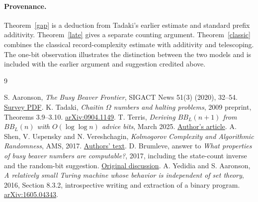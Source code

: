 \documentclass[11pt]{article}
\begin{document}
\paragraph{Provenance.} Theorem~\ref{gap} is a deduction from Tadaki's earlier estimate and standard prefix additivity. Theorem~\ref{late} gives a separate counting argument. Theorem~\ref{classic} combines the classical record-complexity estimate with additivity and telescoping. The one-bit observation illustrates the distinction between the two models and is included with the earlier argument and suggestion credited above.
\begin{thebibliography}{9}\raggedright
{} S. Aaronson, \emph{The Busy Beaver Frontier}, SIGACT News 51(3) (2020), 32--54. \href{https://docs.bbchallenge.org/papers/Aaronson2020.pdf}{Survey PDF}.
 K. Tadaki, \emph{Chaitin $\Omega$ numbers and halting problems}, 2009 preprint, Theorems 3.9--3.10. \href{https://arxiv.org/abs/0904.1149}{arXiv:0904.1149}.
 T. Terris, \emph{Deriving $BB_L(n+1)$ from $BB_L(n)$ with $O(\log\log n)$ advice bits}, March 2025. \href{https://tkterris.github.io/2025/03/13/evolving-busy-beavers.html}{Author's article}.
 A. Shen, V. Uspensky and N. Vereshchagin, \emph{Kolmogorov Complexity and Algorithmic Randomness}, AMS, 2017. \href{https://www.lirmm.fr/~ashen/kolmbook-eng.pdf}{Authors' text}.
 D. Brumleve, answer to \emph{What properties of busy beaver numbers are computable?}, 2017, including the state-count inverse and the random-bit suggestion. \href{https://math.stackexchange.com/questions/271834/what-properties-of-busy-beaver-numbers-are-computable}{Original discussion}.
 A. Yedidia and S. Aaronson, \emph{A relatively small Turing machine whose behavior is independent of set theory}, 2016, Section 8.3.2, introspective writing and extraction of a binary program. \href{https://arxiv.org/abs/1605.04343}{arXiv:1605.04343}.
\end{thebibliography}
\end{document}
